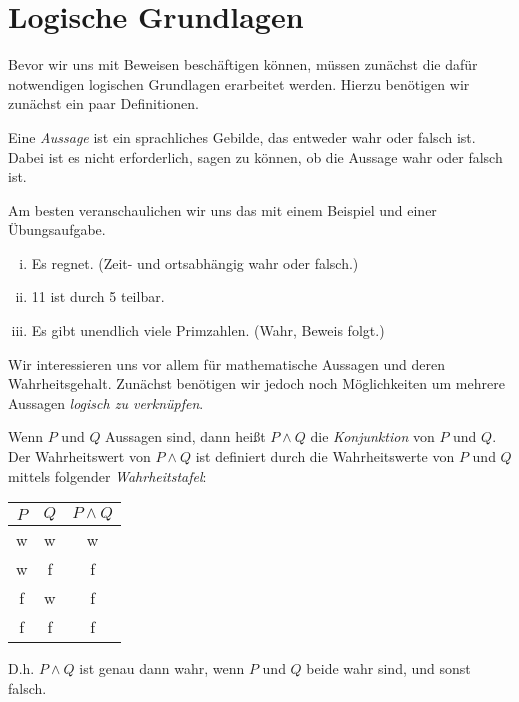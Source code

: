 \chapter{Logische Grundlagen}

Bevor wir uns mit Beweisen beschäftigen können, müssen zunächst die dafür notwendigen logischen
Grundlagen erarbeitet werden. Hierzu benötigen wir zunächst ein paar Definitionen.

\begin{mydef}
    Eine \textit{Aussage} ist ein sprachliches Gebilde, das entweder wahr oder falsch ist.
    Dabei ist es nicht erforderlich, sagen zu können, ob die Aussage wahr oder falsch ist.
\end{mydef}  

Am besten veranschaulichen wir uns das mit einem Beispiel und einer Übungsaufgabe.

\begin{example}
    \begin{enumerate}[(i)]
        \item
        Es regnet. (Zeit- und ortsabhängig wahr oder falsch.)
        \item
        11 ist durch 5 teilbar.
        \item
        Es gibt unendlich viele Primzahlen. (Wahr, Beweis folgt.)
    \end{enumerate}
\end{example} 

Wir interessieren uns vor allem für mathematische Aussagen und deren Wahrheitsgehalt.
Zunächst benötigen wir jedoch noch Möglichkeiten um mehrere Aussagen \textit{ logisch zu verknüpfen}.

\begin{mydef}
    Wenn $P$ und $Q$ Aussagen sind, dann heißt $P \wedge Q$ die \textit{Konjunktion} von $P$ und $Q$.
    Der Wahrheitswert von $P \wedge Q$ ist definiert durch die Wahrheitswerte von $P$ und $Q$ mittels
    folgender \textit{Wahrheitstafel}: \newline
    \begin{tabular}{ c | c | c }
        $P$ & $Q$ & $P \wedge Q$ \\
        \hline
        w & w & w \\
        w & f & f \\
        f & w & f \\
        f & f & f \\
    \end{tabular}
    \newline 
    D.h. $P \wedge Q$ ist genau dann wahr, wenn $P$ und $Q$ beide wahr sind, und sonst falsch.
\end{mydef}

